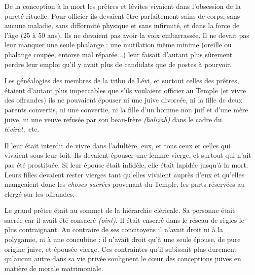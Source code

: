  De la conception à la mort les prêtres et lévites vivaient dans l'obsession de la pureté rituelle. Pour officier ils devaient être parfaitement sains de corps, sans aucune maladie, sans difformité physique et sans infirmité, et dans la force de l'âge (25 à 50 ans). Ils ne devaient pas avoir la voix embarrassée. Il ne devait pas leur manquer une seule phalange : une mutilation même minime (oreille ou phalange coupée, entorse mal réparée...) leur faisait d'autant plus sûrement perdre leur emploi qu'il y avait plus de candidats que de postes à pourvoir. 

 Les généalogies des membres de la tribu de Lévi, et surtout celles des prêtres, étaient d'autant plus impeccables que s'ils voulaient officier au Temple (et vivre des offrandes) ils ne pouvaient épouser ni une juive divorcée, ni la fille de deux parents convertis, ni une convertie, ni la fille d'un homme non juif et d'une mère juive, ni une veuve refusée par son beau-frère \emph{(halizah)} dans le cadre du \emph{lévirat},~etc. 

 Il leur était interdit de vivre dans l'adultère, eux, et tous ceux et celles qui vivaient sous leur toit. Ils devaient épouser une femme vierge, et surtout qui n'ait pas été prostituée. Si leur épouse était infidèle, elle était lapidée jusqu'à la mort. Leurs filles devaient rester vierges tant qu'elles vivaient auprès d'eux et qu'elles mangeaient donc les \emph{choses sacrées} provenant du Temple, les parts réservées au clergé sur les offrandes. 

 Le grand prêtre était au sommet de la hiérarchie cléricale. Sa personne était sacrée car il avait été consacré \emph{(oint)}. Il était enserré dans le réseau de règles le plus contraignant. Au contraire de ses concitoyens il n'avait droit ni à la polygamie, ni à une concubine : il n'avait droit qu'à une seule épouse, de pure origine juive, et épousée vierge. Ces contraintes qu'il subissait plus durement qu'aucun autre dans sa vie privée soulignent le cœur des conceptions juives en matière de morale matrimoniale.
 
